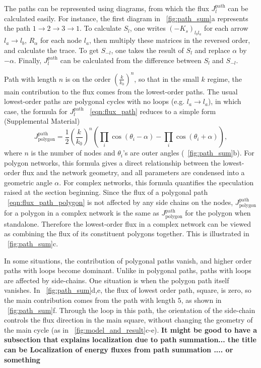 \documentclass[
 preprint,
 preprintnumbers,
 amsmath,amssymb,
 aps,
 pre,
 longbibliography,
 10pt, twocolumn
]{revtex4-1}
\begin{document}
The paths can be represented using diagrams, from which the flux $J^\text{path}_l$ can be calculated easily. For instance, the first diagram in \figurename~\ref{fig:path_sum}a represents the path $1\rightarrow 2\rightarrow 3\rightarrow 1$. To calculate $S_l$, one writes $(-K_s)_{l_bl_a}$ for each arrow $l_a\rightarrow l_b$, $R_\alpha$ for each node $l_a$, then multiply these matrices in the reversed order, and calculate the trace. To get $S_{-l}$, one takes the result of $S_l$ and replace $\alpha$ by $-\alpha$. Finally, $J^\text{path}_l$ can be calculated from the difference between $S_l$ and $S_{-l}$.

Path with length $n$ is on the order $(\frac{k}{k_0})^n$, so that in the small $k$ regime, the main contribution to the flux comes from the lowest-order paths. 
The usual lowest-order paths are polygonal cycles with no loops (e.g. $l_a\rightarrow l_a$), in which case, the formula for $J^\text{path}_l$ \eqnname~\eqref{eqn:flux_path} reduces to a simple form (Supplemental Material)
\begin{equation} \label{eqn:flux_path_polygon}
J^\text{path}_\text{polygon} = \frac{1}{2} (\frac{k}{k_0})^n (\prod_i \cos(\theta_i - \alpha) - \prod_i \cos(\theta_i + \alpha)),
\end{equation}
where $n$ is the number of nodes and $\theta_i$'s are outer angles (\figurename~\ref{fig:path_sum}b).
For polygon networks, this formula gives a direct relationship between the lowest-order flux and the network geometry, and all parameters are condensed into a geometric angle $\alpha$. 
For complex networks, this formula quantifies the speculation raised at the section beginning. Since the flux of a polygonal path \eqnname~\eqref{eqn:flux_path_polygon} is not affected by any side chains on the nodes, $J^\text{path}_\text{polygon}$ for a polygon in a complex network is the same as $J^\text{path}_\text{polygon}$ for the polygon when standalone. Therefore the lowest-order flux in a complex network can be viewed as combining the flux of its constituent polygons together. This is illustrated in \figurename~\ref{fig:path_sum}c.

In some situations, the contribution of polygonal paths vanish, and higher order paths with loops become dominant. Unlike in polygonal paths, paths with loops are affected by side-chains.
One situation is when the polygon path itself vanishes. In \figurename~\ref{fig:path_sum}d,e, the flux of lowest order path, square, is zero, so the main contribution comes from the path with length $5$, as shown in \figurename~\ref{fig:path_sum}f. Through the loop in this path, the orientation of the side-chain controls the flux direction in the main square, without changing the geometry of the main cycle (as in \figurename~\ref{fig:model_and_result}c-e).
{\bf It might be good to have a subsection that explains localization due to path summation... the title can be Localization of energy fluxes from path summation .... or something}
\end{document}
